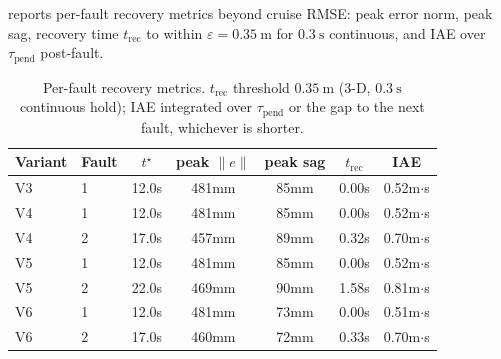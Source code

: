 \documentclass[lettersize,journal]{IEEEtran}
\newtheorem{remark}{Remark}%
\begin{document}
 reports per-fault recovery metrics beyond cruise RMSE: peak error norm, peak sag, recovery time $t_{\mathrm{rec}}$ to within $\varepsilon=\SI{0.35}{\metre}$ for $\SI{0.3}{\second}$ continuous, and IAE over $\tau_{\mathrm{pend}}$ post-fault.

\begin{table}[t]
  \caption{Per-fault recovery metrics. $t_{\mathrm{rec}}$ threshold $\SI{0.35}{\metre}$ (3-D, $\SI{0.3}{\second}$ continuous hold); IAE integrated over $\tau_{\mathrm{pend}}$ or the gap to the next fault, whichever is shorter.}
  \label{tab:recovery-iae}
  \centering
  \small
  \begin{tabular}{llccccc}
    \toprule
    Variant & Fault & $t^\star$ & peak $\|e\|$ &
      peak sag & $t_{\mathrm{rec}}$ & IAE \\
    \midrule
    V3 & 1 & 12.0s & 481mm & 85mm & 0.00s & 0.52m$\cdot$s \\
    V4 & 1 & 12.0s & 481mm & 85mm & 0.00s & 0.52m$\cdot$s \\
    V4 & 2 & 17.0s & 457mm & 89mm & 0.32s & 0.70m$\cdot$s \\
    V5 & 1 & 12.0s & 481mm & 85mm & 0.00s & 0.52m$\cdot$s \\
    V5 & 2 & 22.0s & 469mm & 90mm & 1.58s & 0.81m$\cdot$s \\
    V6 & 1 & 12.0s & 481mm & 73mm & 0.00s & 0.51m$\cdot$s \\
    V6 & 2 & 17.0s & 460mm & 72mm & 0.33s & 0.70m$\cdot$s \\
    \bottomrule
  \end{tabular}
\end{table}


\end{document}
